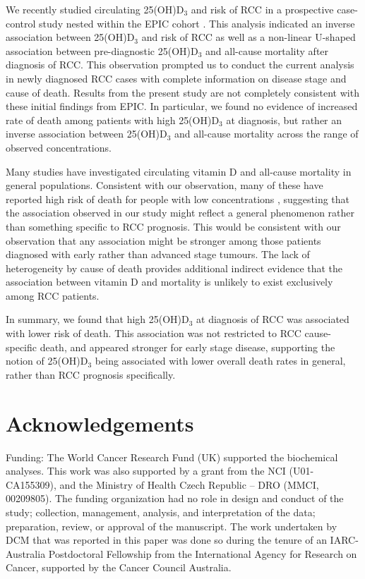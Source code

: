 \documentclass[a4paper,11pt]{article}
\renewcommand{\cite}{\citep}
\begin{document}
We recently studied circulating 25(OH)D$_3$ and risk of RCC in a prospective
case-control study nested within the EPIC cohort \cite{muller_circulating_2014}.
This analysis indicated an inverse association between 
25(OH)D$_3$ and risk of RCC as well as a non-linear U-shaped association 
between pre-diagnostic 25(OH)D$_3$ and all-cause mortality after diagnosis 
of RCC. This observation prompted us to conduct the current analysis in newly 
diagnosed RCC cases with complete information on disease stage 
and cause of death. Results from the present study are not completely 
consistent with these initial findings from EPIC. In particular, we found no 
evidence of increased rate of death among patients with high 25(OH)D$_3$ at 
diagnosis, but rather an inverse association between 25(OH)D$_3$ and all-cause 
mortality across the range of observed concentrations.

Many studies have investigated circulating vitamin D and all-cause 
mortality in general populations. Consistent with our observation, many of these
have reported high risk of death for people with low concentrations 
\cite{schottker_strong_2013, virtanen_association_2011, hutchinson_low_2010, 
szulc_serum_2009, semba_low_2009, pilz_vitamin_2009, 
melamed_ml_25-hydroxyvitamin_2008, jia_nutritional_2007}, suggesting that 
the association observed in our study might reflect a general phenomenon rather 
than something specific to RCC prognosis. This would be consistent with our 
observation that any association might be stronger among those patients 
diagnosed with early rather than advanced stage tumours. The lack of 
heterogeneity by cause of death provides additional indirect evidence that the 
association between vitamin D and mortality is unlikely to exist exclusively 
among RCC patients. 

In summary, we found that high 25(OH)D$_3$ at diagnosis of RCC was associated 
with lower risk of death. This association was not restricted to RCC 
cause-specific death, and appeared stronger for early stage disease, 
supporting the notion of 25(OH)D$_3$ being associated with lower overall death 
rates in general, rather than RCC prognosis specifically. 

\section*{Acknowledgements}
\noindent Funding:
The World Cancer Research Fund (UK) supported the biochemical analyses. This work was 
also supported by a grant from the NCI (U01-CA155309), and the Ministry of Health 
Czech Republic -- DRO (MMCI, 00209805). The funding organization had no role in 
design and conduct of the study; collection, management, analysis, and 
interpretation of the data; preparation, review, or approval of the manuscript. The 
work undertaken by DCM that was reported in this paper was done so during the tenure 
of an IARC-Australia Postdoctoral Fellowship from the International Agency for 
Research on Cancer, supported by the Cancer Council Australia. 
\end{document}

